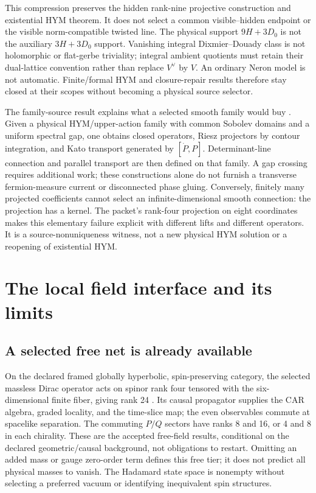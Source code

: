 \documentclass[11pt]{article}
\theoremstyle{definition}
\theoremstyle{remark}
\begin{document}
This compression preserves the hidden rank-nine projective construction
and existential HYM theorem. It does not select a common visible--hidden
endpoint or the visible norm-compatible twisted line. The physical support
\(9H+3D_0\) is not the auxiliary \(3H+3D_0\) support. Vanishing integral
Dixmier--Douady class is not holomorphic or flat-gerbe triviality; integral
ambient quotients must retain their dual-lattice convention rather than
replace \(V^{\vee}\) by \(V\). An ordinary Neron model is not automatic.
Finite/formal HYM and closure-repair results therefore stay closed at their
scopes without becoming a physical source selector.

\label{sec:family-cutset}
The family-source result explains what a selected smooth family would buy
\cite{FrozenFamily}. Given a physical HYM/upper-action family with common
Sobolev domains and a uniform spectral gap, one obtains closed operators,
Riesz projectors by contour integration, and Kato transport generated by
\([\dot P,P]\). Determinant-line connection and parallel transport are
then defined on that family. A gap crossing requires additional work; these
constructions alone do not furnish a transverse fermion-measure current or
disconnected phase gluing. Conversely, finitely many projected coefficients
cannot select an infinite-dimensional smooth connection: the projection
has a kernel. The packet's rank-four projection on eight coordinates makes
this elementary failure explicit with different lifts and different
operators. It is a source-nonuniqueness witness, not a new physical HYM
solution or a reopening of existential HYM.

\section{The local field interface and its limits}
\label{sec:field-interface}

\subsection{A selected free net is already available}
\label{sec:free-dirac}
On the declared framed globally hyperbolic, spin-preserving category, the
selected massless Dirac operator acts on spinor rank four tensored with the
six-dimensional finite fiber, giving rank 24 \cite{FrozenDirac}. Its causal
propagator supplies the CAR algebra, graded locality, and the time-slice
map; the even observables commute at spacelike separation. The commuting
\(P/Q\) sectors have ranks 8 and 16, or 4 and 8 in each chirality.
These are the accepted free-field results, conditional on the declared
geometric/causal background, not obligations to restart. Omitting an added
mass or gauge zero-order term defines this free tier; it does not predict
all physical masses to vanish. The Hadamard state space is nonempty without
selecting a preferred vacuum or identifying inequivalent spin structures.
\end{document}
